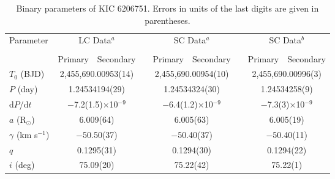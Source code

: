 \documentclass[useAMS,usenatbib,usegraphicx]{mn2e}
\begin{document}
\clearpage
\begin{table}
\caption{Binary parameters of KIC 6206751. Errors in units of the last digits are given in parentheses. }
\begin{tabular}{lcccccccc}
\hline
Parameter                                & \multicolumn{2}{c}{LC Data$^a$}                  && \multicolumn{2}{c}{SC Data$^a$}                  && \multicolumn{2}{c}{SC Data$^b$}                    \\ [1.0mm] \cline{2-3} \cline{5-6} \cline{8-9} \\[-2.0ex]
                                         & Primary           & Secondary                    && Primary           & Secondary                    && Primary           & Secondary                      \\                                                                                         
\hline                                                                                                                                                                                              
$T_0$ (BJD)                              & \multicolumn{2}{c}{2,455,690.00953(14)}          && \multicolumn{2}{c}{2,455,690.00954(10)}          && \multicolumn{2}{c}{2,455,690.00996(3)}             \\ 
$P$ (day)                                & \multicolumn{2}{c}{1.24534194(29)}               && \multicolumn{2}{c}{1.24534324(30)}               && \multicolumn{2}{c}{1.24534258(9)}                  \\
d$P$/d$t$                                & \multicolumn{2}{c}{$-$7.2(1.5)$\times$10$^{-9}$} && \multicolumn{2}{c}{$-$6.4(1.2)$\times$10$^{-9}$} && \multicolumn{2}{c}{$-$7.3(3)$\times$10$^{-9}$}     \\
$a$ (R$_\odot$)                          & \multicolumn{2}{c}{6.009(64)}                    && \multicolumn{2}{c}{6.005(63)}                    && \multicolumn{2}{c}{6.005(19)}                      \\
$\gamma$ (km s$^{-1}$)                   & \multicolumn{2}{c}{$-$50.50(37)}                 && \multicolumn{2}{c}{$-$50.40(37)}                 && \multicolumn{2}{c}{$-$50.40(11)}                   \\
$q$                                      & \multicolumn{2}{c}{0.1295(31)}                   && \multicolumn{2}{c}{0.1294(30)}                   && \multicolumn{2}{c}{0.1294(22)}                     \\
$i$ (deg)                                & \multicolumn{2}{c}{75.09(20)}                    && \multicolumn{2}{c}{75.22(42)}                    && \multicolumn{2}{c}{75.22(1)}                       \\

\end{tabular}
\end{table}
\end{document}
